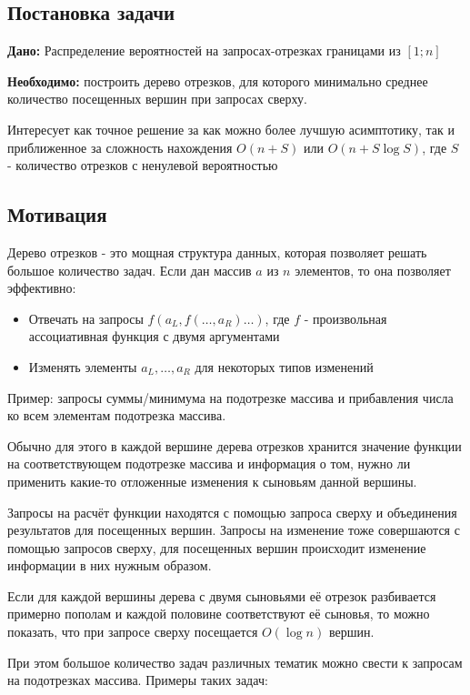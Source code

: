 \subsection{Постановка задачи}

\textbf{Дано:} Распределение вероятностей на запросах-отрезках границами из $[1; n]$

\textbf{Необходимо:} построить дерево отрезков, для которого минимально среднее
количество посещенных вершин при запросах сверху.

Интересует как точное решение за как можно более лучшую асимптотику, так и
приближенное за сложность нахождения $O(n + S)$ или $O(n + S \log S)$, где $S$ -
количество отрезков с ненулевой вероятностью

\subsection{Мотивация}

Дерево отрезков - это мощная структура данных, которая позволяет решать большое количество задач. 
Если дан массив $a$ из $n$ элементов, то она позволяет эффективно:

\begin{itemize}
    \item Отвечать на запросы $f(a_L, f(\dots, a_R)\dots)$, где $f$ - произвольная ассоциативная функция с двумя аргументами
    \item Изменять элементы $a_L,\dots,a_R$ для некоторых типов изменений
\end{itemize}

Пример: запросы суммы/минимума на подотрезке массива и прибавления числа ко всем элементам подотрезка массива.

Обычно для этого в каждой вершине дерева отрезков хранится значение функции на соответствующем подотрезке массива и информация о том, нужно ли применить какие-то отложенные изменения к сыновьям данной вершины.

Запросы на расчёт функции находятся с помощью запроса сверху и объединения результатов для посещенных вершин. Запросы на изменение тоже совершаются с помощью запросов сверху, для посещенных вершин происходит изменение информации в них нужным образом.

Если для каждой вершины дерева с двумя сыновьями её отрезок разбивается примерно пополам и каждой половине соответствуют её сыновья, то можно показать, что при запросе сверху посещается $O(\log n)$ вершин.

При этом большое количество задач различных тематик можно свести к запросам на подотрезках массива. Примеры таких задач:

